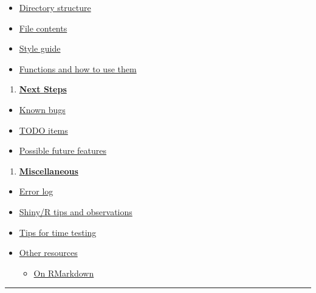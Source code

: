 \documentclass[]{article}
\providecommand{\tightlist}{%
  \setlength{\itemsep}{0pt}\setlength{\parskip}{0pt}}
\begin{document}
\begin{itemize}
\tightlist
\item
  \protect\hyperlink{directory-structure}{Directory structure}
\item
  \protect\hyperlink{file-contents}{File contents}
\item
  \protect\hyperlink{style-guide}{Style guide}
\item
  \protect\hyperlink{tidygeo-functions}{Functions and how to use them}
\end{itemize}

\begin{enumerate}
\def\labelenumi{\arabic{enumi}.}
\setcounter{enumi}{4}
\tightlist
\item
  \textbf{\protect\hyperlink{next-steps}{Next Steps}}
\end{enumerate}

\begin{itemize}
\tightlist
\item
  \protect\hyperlink{known-bugs}{Known bugs}
\item
  \protect\hyperlink{todo-items}{TODO items}
\item
  \protect\hyperlink{future-features}{Possible future features}
\end{itemize}

\begin{enumerate}
\def\labelenumi{\arabic{enumi}.}
\setcounter{enumi}{4}
\tightlist
\item
  \textbf{\protect\hyperlink{misc}{Miscellaneous}}
\end{enumerate}

\begin{itemize}
\tightlist
\item
  \protect\hyperlink{error-log}{Error log}
\item
  \protect\hyperlink{observations}{Shiny/R tips and observations}
\item
  \protect\hyperlink{time-testing}{Tips for time testing}
\item
  \protect\hyperlink{other-resources}{Other resources}

  \begin{itemize}
  \tightlist
  \item
    \protect\hyperlink{Rmarkdown-resource}{On RMarkdown}
  \end{itemize}
\end{itemize}

\begin{center}\rule{0.5\linewidth}{\linethickness}\end{center}
\end{document}
